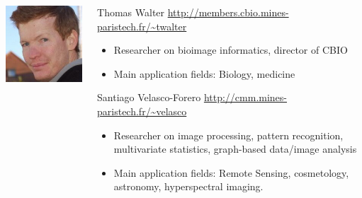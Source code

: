 \documentclass[xcolor=pdftex,dvipsnames,table,mathserif]{beamer}
\begin{document}
{\begin{columns}
\begin{column}{.2\textwidth}
\vspace{2em}
    \includegraphics[width=\textwidth]{ed.jpg}

  \end{column}
  \begin{column}{.8\textwidth}

    \begin{block}{Thomas Walter \hfill \scriptsize{\url{http://members.cbio.mines-paristech.fr/\~twalter}}}
      \scriptsize{
    \begin{itemize}
    \item Researcher on bioimage informatics, director of CBIO
    \item Main application fields: Biology, medicine
    \end{itemize}
    }
  \end{block}

  \begin{block}{Santiago Velasco-Forero  \hfill \scriptsize{\url{http://cmm.mines-paristech.fr/\~velasco}}}
      \scriptsize{
    \begin{itemize}
    \item Researcher on image processing, pattern recognition, multivariate statistics, graph-based data/image analysis
    \item Main application fields: Remote Sensing, cosmetology, astronomy, hyperspectral imaging.
    \end{itemize}
    }
  \end{block}


\end{column}
\end{columns}}
\end{document}
